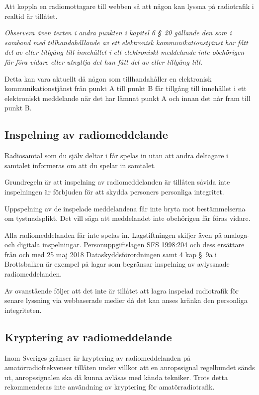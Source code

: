 Att koppla en radiomottagare till webben så att någon kan lyssna på radiotrafik
i realtid är tillåtet.

\emph{Observera även texten i andra punkten i kapitel 6 \S~20 gällande den som i
	samband med tillhandahållande av ett elektronisk kommunikationstjänst har fått
	del av eller tillgång till innehållet i ett elektroniskt meddelande inte
	obehörigen får föra vidare eller utnyttja det han fått del av eller tillgång
	till.}

\newpage %
Detta kan vara aktuellt då någon som tillhandahåller en elektronisk
kommunikationstjänst från punkt A till punkt B får tillgång till innehållet i
ett elektroniskt meddelande när det har lämnat punkt A och innan det når fram
till punkt B.

\subsection{Inspelning av radiomeddelande}

Radiosamtal som du själv deltar i får spelas in utan att andra deltagare i
samtalet informeras om att du spelar in samtalet.

Grundregeln är att inspelning av radiomeddelanden är tillåten såvida inte
inspelningen är förbjuden för att skydda personers personliga integritet.

Uppspelning av de inspelade meddelandena får inte bryta mot bestämmelserna om
tystnadsplikt.
Det vill säga att meddelandet inte obehörigen får föras vidare.

Alla radiomeddelanden får inte spelas in.
Lagstiftningen skiljer även på analoga- och digitala inspelningar.
Personuppgiftslagen SFS 1998:204 \cite{SFS1998:204} och dess ersättare från och
med 25 maj 2018 Dataskyddsförordningen \cite{GDPR} samt 4 kap \S~9a i
Brottsbalken \cite{SFS1962:700} är exempel på lagar som begränsar inspelning av
avlyssnade radiomeddelanden.

Av ovanstående följer att det inte är tillåtet att lagra inspelad radiotrafik
för senare lyssning via webbaserade medier då det kan anses kränka den
personliga integriteten.

\subsection{Kryptering av radiomeddelande}
\label{kryptering av radiomeddelande}

Inom Sveriges gränser är kryptering av radiomeddelanden på amatörradiofrekvenser
tillåten under villkor att en anropssignal regelbundet sänds ut, anropssignalen
ska då kunna avläsas med kända tekniker.
Trots detta rekommenderas inte användning av kryptering för amatörradiotrafik.

